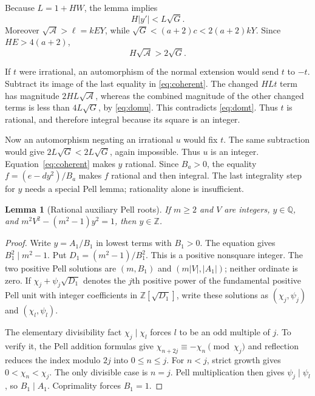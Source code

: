 \documentclass[11pt]{article}
\newtheorem{lemma}[theorem]{Lemma}
\theoremstyle{remark}\newtheorem{remark}[theorem]{Remark}
\newcommand{\Z}{\mathbb Z}\newcommand{\N}{\mathbb N}
\begin{document}
Because $L=1+HW$, the lemma implies
\begin{equation}
 H|y'|<L\sqrt G.\label{eq:domu}
\end{equation}
Moreover $\sqrt{\mathcal A}>\ell=kEY$, while
$\sqrt G<(a+2)c<2(a+2)kY$. Since $HE>4(a+2)$,
\begin{equation}
 H\sqrt{\mathcal A}>2\sqrt G.\label{eq:domt}
\end{equation}

If $t$ were irrational, an automorphism of the normal extension would
send $t$ to $-t$. Subtract its image of the last equality in
\eqref{eq:coherent}. The changed $HLt$ term has magnitude
$2HL\sqrt{\mathcal A}$, whereas the combined magnitude of the other
changed terms is less than $4L\sqrt G$, by \eqref{eq:domu}.
This contradicts \eqref{eq:domt}. Thus $t$ is rational, and therefore
integral because its square is an integer.

Now an automorphism negating an irrational $u$ would fix $t$. The same
subtraction would give $2L\sqrt G<2L\sqrt G$, again impossible.
Thus $u$ is an integer. Equation~\eqref{eq:coherent} makes $y$ rational.
Since $B_a>0$, the equality $f=(e-dy^2)/B_a$ makes $f$ rational and
then integral. The last integrality step for $y$ needs a special Pell
lemma; rationality alone is insufficient.

\begin{lemma}[Rational auxiliary Pell roots]\label{lem:saturation}
If $m\geq2$ and $V$ are integers, $y\in\mathbb Q$, and
$m^2V^2-(m^2-1)y^2=1$, then $y\in\mathbb Z$.
\end{lemma}
\begin{proof}
Write $y=A_1/B_1$ in lowest terms with $B_1>0$. The equation gives
$B_1^2\mid m^2-1$. Put $D_1=(m^2-1)/B_1^2$. This is a positive
nonsquare integer. The two positive Pell solutions are
$(m,B_1)$ and $(m|V|,|A_1|)$; neither ordinate is zero.
If $\chi_j+\psi_j\sqrt{D_1}$ denotes the $j$th positive power of
the fundamental positive Pell unit with integer coefficients in
$\Z[\sqrt{D_1}]$, write these solutions as
$(\chi_j,\psi_j)$ and $(\chi_l,\psi_l)$.

The elementary divisibility fact $\chi_j\mid\chi_l$ forces $l$ to
be an odd multiple of $j$. To verify it, the Pell addition formulas give
$\chi_{n+2j}\equiv-\chi_n\pmod{\chi_j}$ and reflection reduces
the index modulo $2j$ into $0\leq n\leq j$. For $n<j$, strict
growth gives $0<\chi_n<\chi_j$. The only divisible case is $n=j$.
Pell multiplication then gives $\psi_j\mid\psi_l$, so
$B_1\mid A_1$. Coprimality forces $B_1=1$.
\end{proof}
\end{document}
